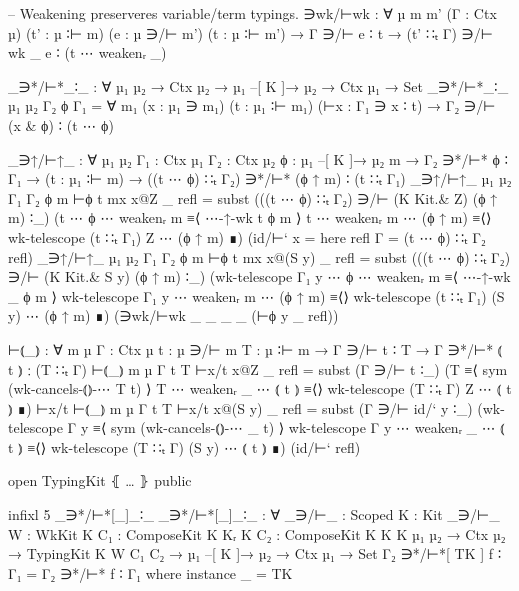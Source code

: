 \begin{code}
              -- Weakening preserveres variable/term typings.
              ∋wk/⊢wk  : ∀ {µ m m'} (Γ : Ctx µ) (t' : µ ∶⊢ m) (e : µ ∋/⊢ m') (t : µ ∶⊢ m')
                        → Γ ∋/⊢ e ∶ t
                        → (t' ∷ₜ Γ) ∋/⊢ wk _ e ∶ (t ⋯ weakenᵣ _)

            _∋*/⊢*_∶_ : ∀ {µ₁ µ₂} → Ctx µ₂ → µ₁ –[ K ]→ µ₂ → Ctx µ₁ → Set
            _∋*/⊢*_∶_ {µ₁} {µ₂} Γ₂ ϕ Γ₁ =
              ∀ {m₁} (x : µ₁ ∋ m₁) (t : µ₁ ∶⊢ m₁) (⊢x : Γ₁ ∋ x ∶ t)
              → Γ₂ ∋/⊢ (x & ϕ) ∶ (t ⋯ ϕ)

            _∋↑/⊢↑_ : ∀ {µ₁} {µ₂} {Γ₁ : Ctx µ₁} {Γ₂ : Ctx µ₂} {ϕ : µ₁ –[ K ]→ µ₂} {m} →
              Γ₂             ∋*/⊢* ϕ       ∶ Γ₁ →
              (t : µ₁ ∶⊢ m) →
              ((t ⋯ ϕ) ∷ₜ Γ₂) ∋*/⊢* (ϕ ↑ m) ∶ (t ∷ₜ Γ₁)
            _∋↑/⊢↑_ {µ₁} {µ₂} {Γ₁} {Γ₂} {ϕ} {m} ⊢ϕ t {mx} x@Z _ refl =
              subst (((t ⋯ ϕ) ∷ₜ Γ₂) ∋/⊢ (K Kit.& Z) (ϕ ↑ m) ∶_)
                    (t ⋯ ϕ ⋯ weakenᵣ m                  ≡⟨ ⋯-↑-wk t ϕ m ⟩
                     t ⋯ weakenᵣ m ⋯ (ϕ ↑ m)            ≡⟨⟩
                     wk-telescope (t ∷ₜ Γ₁) Z ⋯ (ϕ ↑ m) ∎)
                    (id/⊢` {x = here refl} {Γ = (t ⋯ ϕ) ∷ₜ Γ₂} refl)
            _∋↑/⊢↑_ {µ₁} {µ₂} {Γ₁} {Γ₂} {ϕ} {m} ⊢ϕ t {mx} x@(S y) _ refl =
              subst (((t ⋯ ϕ) ∷ₜ Γ₂) ∋/⊢ (K Kit.& S y) (ϕ ↑ m) ∶_)
                    (wk-telescope Γ₁ y ⋯ ϕ ⋯ weakenᵣ m       ≡⟨ ⋯-↑-wk _ ϕ m ⟩
                     wk-telescope Γ₁ y ⋯ weakenᵣ m ⋯ (ϕ ↑ m) ≡⟨⟩
                     wk-telescope (t ∷ₜ Γ₁) (S y) ⋯ (ϕ ↑ m)  ∎)
                    (∋wk/⊢wk _ _ _ _ (⊢ϕ y _ refl))

            ⊢⦅_⦆ : ∀ {m µ} {Γ : Ctx µ} {t : µ ∋/⊢ m} {T : µ ∶⊢ m}
              → Γ ∋/⊢ t ∶ T 
              → Γ ∋*/⊢* ⦅ t ⦆ ∶ (T ∷ₜ Γ)
            ⊢⦅_⦆ {m} {µ} {Γ} {t} {T} ⊢x/t x@Z _ refl =
              subst (Γ ∋/⊢ t ∶_)
                    (T                               ≡⟨ sym (wk-cancels-⦅⦆-⋯ T t) ⟩
                     T ⋯ weakenᵣ _ ⋯ ⦅ t ⦆           ≡⟨⟩
                     wk-telescope (T ∷ₜ Γ) Z ⋯ ⦅ t ⦆ ∎)
                    ⊢x/t
            ⊢⦅_⦆ {m} {µ} {Γ} {t} {T} ⊢x/t x@(S y) _ refl =
              subst (Γ ∋/⊢ id/` y ∶_)
                    (wk-telescope Γ y                     ≡⟨ sym (wk-cancels-⦅⦆-⋯ _ t) ⟩
                     wk-telescope Γ y ⋯ weakenᵣ _ ⋯ ⦅ t ⦆ ≡⟨⟩
                     wk-telescope (T ∷ₜ Γ) (S y) ⋯ ⦅ t ⦆  ∎)
                    (id/⊢` refl)

          open TypingKit ⦃ … ⦄ public

          infixl  5  _∋*/⊢*[_]_∶_
          _∋*/⊢*[_]_∶_ :
            ∀ {_∋/⊢_ : Scoped} {K : Kit _∋/⊢_}
              {W : WkKit K} {C₁ : ComposeKit K Kᵣ K} {C₂ : ComposeKit K K K}
              {µ₁ µ₂}
            → Ctx µ₂ → TypingKit K W C₁ C₂ → µ₁ –[ K ]→ µ₂ → Ctx µ₁ → Set
          Γ₂ ∋*/⊢*[ TK ] f ∶ Γ₁ = Γ₂ ∋*/⊢* f ∶ Γ₁ where instance _ = TK


\end{code}
